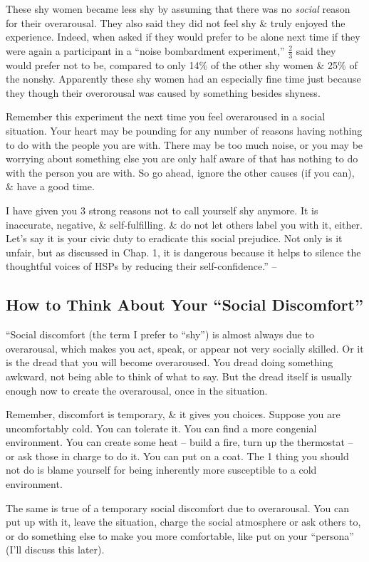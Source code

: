 \documentclass{article}
\numberwithin{equation}{section}
\begin{document}
These shy women became less shy by assuming that there was no \textit{social} reason for their overarousal. They also said they did not feel shy \& truly enjoyed the experience. Indeed, when asked if they would prefer to be alone next time if they were again a participant in a ``noise bombardment experiment,'' $\frac{2}{3}$ said they would prefer not to be, compared to only 14\% of the other shy women \& 25\% of the nonshy. Apparently these shy women had an especially fine time just because they though their overorousal was caused by something besides shyness.

Remember this experiment the next time you feel overaroused in a social situation. Your heart may be pounding for any number of reasons having nothing to do with the people you are with. There may be too much noise, or you may be worrying about something else you are only half aware of that has nothing to do with the person you are with. So go ahead, ignore the other causes (if you can), \& have a good time.

I have given you 3 strong reasons not to call yourself shy anymore. It is inaccurate, negative, \& self-fulfilling. \& do not let others label you with it, either. Let's say it is your civic duty to eradicate this social prejudice. Not only is it unfair, but as discussed in Chap. 1, it is dangerous because it helps to silence the thoughtful voices of HSPs by reducing their self-confidence.'' -- \cite[pp. 125--126]{Aron2013}

\subsection{How to Think About Your ``Social Discomfort''}
``Social discomfort (the term I prefer to ``shy'') is almost always due to overarousal, which makes you act, speak, or appear not very socially skilled. Or it is the dread that you will become overaroused. You dread doing something awkward, not being able to think of what to say. But the dread itself is usually enough now to create the overarousal, once in the situation.

Remember, discomfort is temporary, \& it gives you choices. Suppose you are uncomfortably cold. You can tolerate it. You can find a more congenial environment. You can create some heat -- build a fire, turn up the thermostat -- or ask those in charge to do it. You can put on a coat. The 1 thing you should not do is blame yourself for being inherently more susceptible to a cold environment.

The same is true of a temporary social discomfort due to overarousal. You can put up with it, leave the situation, charge the social atmosphere or ask others to, or do something else to make you more comfortable, like put on your ``persona'' (I'll discuss this later).
\end{document}
